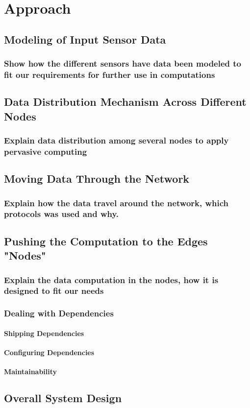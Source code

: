 
\chapter{Approach}\label{chapter:Approach}

\section{Modeling of Input Sensor Data}

\subsection{Show how the different sensors have data been modeled to fit our requirements for further use in computations}
\section{Data Distribution Mechanism Across Different Nodes}
\subsection{Explain data distribution among several nodes to apply pervasive computing}
\section{Moving Data Through the Network}
\subsection{Explain how the data travel around the network, which protocols was used and why.}
\section{Pushing the Computation to the Edges "Nodes"}
\subsection{Explain the data computation in the nodes, how it is designed to fit our needs}
\subsection{Dealing with Dependencies}
\subsubsection{Shipping Dependencies}
\subsubsection{Configuring Dependencies}
\subsubsection{Maintainability}

\section{Overall System Design}

